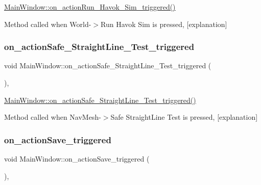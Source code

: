 \hyperlink{class_main_window_ac9c08be5071382e5c549eaa3d5d9ccaf}{Main\+Window\+::on\+\_\+action\+Run\+\_\+\+Havok\+\_\+\+Sim\+\_\+triggered()} 

Method called when World-\/$>$Run Havok Sim is pressed, \mbox{[}explanation\mbox{]} \mbox{\label{class_main_window_aa5b57537f8b86d9eeebcde5271b706dd}} 
\subsubsection{\texorpdfstring{on\+\_\+action\+Safe\+\_\+\+Straight\+Line\+\_\+\+Test\+\_\+triggered}{on\_actionSafe\_StraightLine\_Test\_triggered}}
{\footnotesize\ttfamily void Main\+Window\+::on\+\_\+action\+Safe\+\_\+\+Straight\+Line\+\_\+\+Test\+\_\+triggered (\begin{DoxyParamCaption}{ }\end{DoxyParamCaption})\hspace{0.3cm}{\ttfamily [private]}, {\ttfamily [slot]}}



\hyperlink{class_main_window_aa5b57537f8b86d9eeebcde5271b706dd}{Main\+Window\+::on\+\_\+action\+Safe\+\_\+\+Straight\+Line\+\_\+\+Test\+\_\+triggered()} 

Method called when Nav\+Mesh-\/$>$Safe Straight\+Line Test is pressed, \mbox{[}explanation\mbox{]} \mbox{\label{class_main_window_ad550c61cfa05c7e528dedc6cf636ed10}} 
\subsubsection{\texorpdfstring{on\+\_\+action\+Save\+\_\+triggered}{on\_actionSave\_triggered}}
{\footnotesize\ttfamily void Main\+Window\+::on\+\_\+action\+Save\+\_\+triggered (\begin{DoxyParamCaption}{ }\end{DoxyParamCaption})\hspace{0.3cm}{\ttfamily [private]}, {\ttfamily [slot]}}



